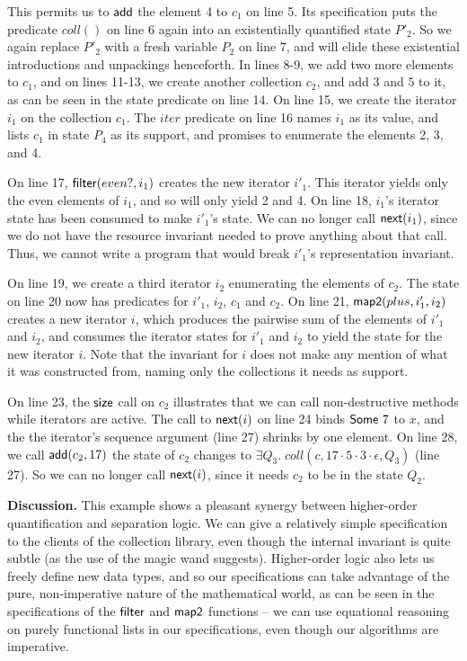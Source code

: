 \documentclass[preprint,natbib]{sigplanconf}
\begin{document}
This permits us to $\mbox{\textsf{{add}}}$ the element 4 to $c_1$ on line 5. Its
specification puts the predicate $coll()$ on line 6 again into an
existentially quantified state $P'_2$. So we again replace $P'_2$ with
a fresh variable $P_2$ on line 7, and will elide these existential
introductions and unpackings henceforth.
%
In lines 8-9, we add two more elements to $c_1$, and on lines 11-13,
we create another collection $c_2$, and add $3$ and $5$ to it, as can
be seen in the state predicate on line 14. On line 15, we create the
iterator $i_1$ on the collection $c_1$. The $iter$ predicate on line
16 names $i_1$ as its value, and lists $c_1$ in state $P_4$ as its
support, and promises to enumerate the elements 2, 3, and 4.

On line 17, $\mbox{\textsf{{filter}}}(even?, i_1)$ creates the new iterator
$i'_1$. This iterator yields only the even elements of $i_1$, and so
will only yield 2 and 4. On line 18, $i_1$'s iterator state has been
consumed to make $i'_1$'s state. We can no longer call
$\mbox{\textsf{{next}}}(i_1)$, since we do not have the resource invariant
needed to prove anything about that call. Thus, we cannot write a
program that would break $i'_1$'s representation invariant.

On line 19, we create a third iterator $i_2$ enumerating the elements
of $c_2$. The state on line 20 now has predicates for $i'_1$, $i_2$,
$c_1$ and $c_2$. On line 21, $\mbox{\textsf{{map2}}}(plus, i'_1, i_2)$ creates a
new iterator $i$, which produces the pairwise sum of the elements of
$i'_1$ and $i_2$, and consumes the iterator states for $i'_1$ and
$i_2$ to yield the state for the new iterator $i$. Note that the 
invariant for $i$ does not make any mention of what it was constructed
from, naming only the collections it needs as support. 

On line 23, the $\mbox{\textsf{{size}}}$ call on $c_2$ illustrates that we can
call non-destructive methods while iterators are active. The call to
$\mbox{\textsf{{next}}}(i)$ on line 24 binds $\mbox{\textsf{{Some }}}7$ to $x$, and the
the iterator's sequence argument (line 27) shrinks by one element. On
line 28, we call $\mbox{\textsf{{add}}}(c_2, 17)$ the state of $c_2$ changes to
$\exists Q_3.\; coll(c, 17\cdot 5 \cdot 3\cdot\epsilon, Q_3)$ (line
27). So we can no longer call $\mbox{\textsf{{next}}}(i)$, since it needs $c_2$
to be in the state $Q_2$.

\textbf{Discussion.} This example shows a pleasant synergy between
higher-order quantification and separation logic. We can give a
relatively simple specification to the clients of the collection
library, even though the internal invariant is quite subtle (as the
use of the magic wand suggests). Higher-order logic also lets us
freely define new data types, and so our specifications can take
advantage of the pure, non-imperative nature of the mathematical
world, as can be seen in the specifications of the $\mbox{\textsf{{filter}}}$
and $\mbox{\textsf{{map2}}}$ functions -- we can use equational reasoning on
purely functional lists in our specifications, even though our
algorithms are imperative.
\end{document}
